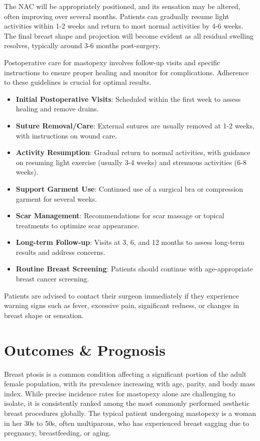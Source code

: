 The NAC will be appropriately positioned, and its sensation may be altered, often improving over several months. Patients can gradually resume light activities within 1-2 weeks and return to most normal activities by 4-6 weeks. The final breast shape and projection will become evident as all residual swelling resolves, typically around 3-6 months post-surgery.

Postoperative care for mastopexy involves follow-up visits and specific instructions to ensure proper healing and monitor for complications. Adherence to these guidelines is crucial for optimal results.

\begin{itemize}
  \item \textbf{Initial Postoperative Visits}: Scheduled within the first week to assess healing and remove drains.
  
  \item \textbf{Suture Removal/Care}: External sutures are usually removed at 1-2 weeks, with instructions on wound care.
  
  \item \textbf{Activity Resumption}: Gradual return to normal activities, with guidance on resuming light exercise (usually 3-4 weeks) and strenuous activities (6-8 weeks).
  
  \item \textbf{Support Garment Use}: Continued use of a surgical bra or compression garment for several weeks.
  
  \item \textbf{Scar Management}: Recommendations for scar massage or topical treatments to optimize scar appearance.
  
  \item \textbf{Long-term Follow-up}: Visits at 3, 6, and 12 months to assess long-term results and address concerns.
  
  \item \textbf{Routine Breast Screening}: Patients should continue with age-appropriate breast cancer screening.
\end{itemize}

Patients are advised to contact their surgeon immediately if they experience warning signs such as fever, excessive pain, significant redness, or changes in breast shape or sensation.

\section*{Outcomes \& Prognosis}
Breast ptosis is a common condition affecting a significant portion of the adult female population, with its prevalence increasing with age, parity, and body mass index. While precise incidence rates for mastopexy alone are challenging to isolate, it is consistently ranked among the most commonly performed aesthetic breast procedures globally. The typical patient undergoing mastopexy is a woman in her 30s to 50s, often multiparous, who has experienced breast sagging due to pregnancy, breastfeeding, or aging.

